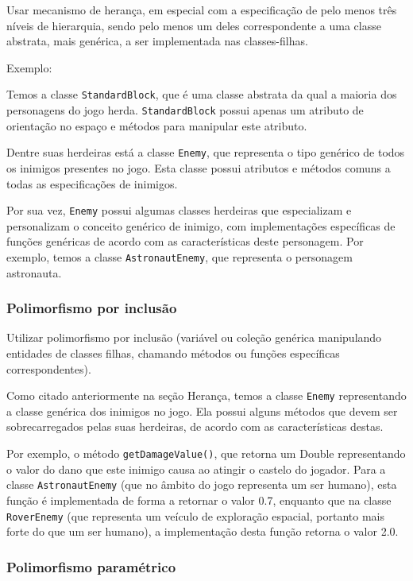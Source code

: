 \documentclass[rel_mlp]{iiufrgs}
\begin{document}
Usar mecanismo de herança, em especial com a especificação de pelo menos três níveis de hierarquia, sendo pelo menos um deles correspondente a uma classe abstrata, mais genérica, a ser implementada nas classes-filhas.

Exemplo:

Temos a classe \texttt{StandardBlock}, que é uma classe abstrata da  qual a maioria dos personagens do jogo herda. \texttt{StandardBlock} possui apenas um atributo de orientação no espaço e métodos para manipular este atributo.

Dentre suas herdeiras está a classe \texttt{Enemy}, que representa o tipo genérico de todos os inimigos presentes no jogo. Esta classe possui atributos e métodos comuns a todas as especificações de inimigos.

Por sua vez, \texttt{Enemy} possui algumas classes herdeiras que especializam e personalizam o conceito genérico de inimigo, com implementações específicas de funções genéricas de acordo com as características deste personagem. Por exemplo, temos a classe \texttt{AstronautEnemy}, que representa o personagem astronauta.


\subsubsection{Polimorfismo por inclusão}

Utilizar polimorfismo por inclusão (variável ou coleção genérica manipulando entidades de classes filhas, chamando métodos ou funções específicas correspondentes).

Como citado anteriormente na seção Herança, temos a classe \texttt{Enemy} representando a classe genérica dos inimigos no jogo. Ela possui alguns métodos que devem ser sobrecarregados pelas suas herdeiras, de acordo com as características destas.

Por exemplo, o método \texttt{getDamageValue()}, que retorna um Double representando o valor do dano que este inimigo causa ao atingir o castelo do jogador. Para a classe \texttt{AstronautEnemy} (que no âmbito do jogo representa um ser humano), esta função é implementada de forma a retornar o valor 0.7, enquanto que na classe \texttt{RoverEnemy} (que representa um veículo de exploração espacial, portanto mais forte do que um ser humano), a implementação desta função retorna o valor 2.0.


\subsubsection{Polimorfismo paramétrico}
\end{document}
